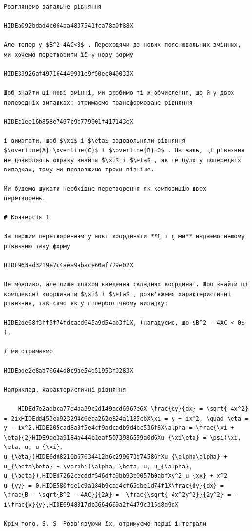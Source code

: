 \documentclass[
  ukrainian,
]{article}
\begin{document}
\begin{verbatim}
Розглянемо загальне рівняння

HIDEa092bdad4c064aa4837541fca78a0f88X

Але тепер у $B^2-4AC<0$ . Переходячи до нових пояснювальних змінних, ми хочемо перетворити її у нову форму

HIDE33926af497164449931e9f50ec040033X

Щоб знайти ці нові змінні, ми зробимо ті ж обчислення, що й у двох попередніх випадках: отримаємо трансформоване рівняння

HIDEc1ee16b858e7497c9c779901f417143eX

і вимагати, щоб $\xi$ і $\eta$ задовольняли рівняння $\overline{A}=\overline{C}$ і $\overline{B}=0$ . На жаль, ці рівняння не дозволяють одразу знайти $\xi$ і $\eta$ , як це було у попередніх випадках, тому ми продовжимо трохи пізніше.

Ми будемо шукати необхідне перетворення як композицію двох перетворень.

# Конверсія 1

За першим перетворенням у нові координати **ξ і ŋ ми** надаємо нашому рівнянню таку форму

HIDE963ad3219e7c4aea9abace60af729e02X

Це можливо, але лише шляхом введення складних координат. Щоб знайти ці комплексні координати $\xi$ і $\eta$ , розв'яжемо характеристичні рівняння, так само як у гіперболічному випадку:

HIDE2de68f3ff5f74fdcacd645a9d54ab3f1X, (нагадуємо, що $B^2 - 4AC < 0$ ),

і ми отримаємо

HIDEbde2e8aa76644d0c9ae54d51953f0283X

Наприклад, характеристичні рівняння

    HIDEd7e2adbca77d4ba39c2d149acd6967e6X \frac{dy}{dx} = \sqrt{-4x^2} = 2ixHIDEdd453ea923294c6eaa262e824a1185cbX\xi = y + ix^2, \quad \eta = y - ix^2.HIDE205cad8a0f5e4cf9adcadb9d4bc536f8X\alpha = \frac{\xi + \eta}{2}HIDE9ae3a9184b444b1eaf5073986559a0d6Xu_{\xi\eta} = \psi(\xi, \eta, u, u_{\xi}, u_{\eta})HIDE6dd8210b67634412b6c299673d74586fXu_{\alpha\alpha} + u_{\beta\beta} = \varphi(\alpha, \beta, u, u_{\alpha}, u_{\beta}),HIDEd7262cecddf546dfa9bb93b0057b0abfXy^2 u_{xx} + x^2 u_{yy} = 0,HIDE580fde1c9a184b9cad4cf65dbe1d74f1X\frac{dy}{dx} = \frac{B - \sqrt{B^2 - 4AC}}{2A} = -\frac{\sqrt{-4x^2y^2}}{2y^2} = -i\frac{x}{y},HIDE6948017db3664669a2f4479c315d8d9dX

Крім того, S. S. Розв'язуючи їх, отримуємо перші інтеграли


\end{verbatim}
\end{document}

